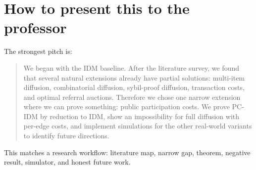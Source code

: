 \documentclass[11pt]{article}
\begin{document}
\section{How to present this to the professor}

The strongest pitch is:
\begin{quote}
We began with the IDM baseline.  After the literature survey, we found that several natural extensions already have partial solutions: multi-item diffusion, combinatorial diffusion, sybil-proof diffusion, transaction costs, and optimal referral auctions.  Therefore we chose one narrow extension where we can prove something: public participation costs.  We prove PC-IDM by reduction to IDM, show an impossibility for full diffusion with per-edge costs, and implement simulations for the other real-world variants to identify future directions.
\end{quote}

This matches a research workflow: literature map, narrow gap, theorem, negative result, simulator, and honest future work.
\end{document}
